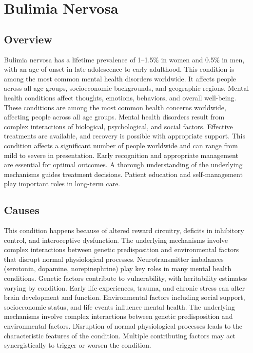 \chapter{Bulimia Nervosa}
\label{sec:Bulimia Nervosa}

\section{Overview}
Bulimia nervosa has a lifetime prevalence of 1--1.5\% in women and 0.5\% in men, with an age of onset in late adolescence to early adulthood. This condition is among the most common mental health disorders worldwide. It affects people across all age groups, socioeconomic backgrounds, and geographic regions. Mental health conditions affect thoughts, emotions, behaviors, and overall well-being. These conditions are among the most common health concerns worldwide, affecting people across all age groups. Mental health disorders result from complex interactions of biological, psychological, and social factors. Effective treatments are available, and recovery is possible with appropriate support. This condition affects a significant number of people worldwide and can range from mild to severe in presentation. Early recognition and appropriate management are essential for optimal outcomes. A thorough understanding of the underlying mechanisms guides treatment decisions. Patient education and self-management play important roles in long-term care.
\section{Causes}
This condition happens because of altered reward circuitry, deficits in inhibitory control, and interoceptive dysfunction. The underlying mechanisms involve complex interactions between genetic predisposition and environmental factors that disrupt normal physiological processes. Neurotransmitter imbalances (serotonin, dopamine, norepinephrine) play key roles in many mental health conditions. Genetic factors contribute to vulnerability, with heritability estimates varying by condition. Early life experiences, trauma, and chronic stress can alter brain development and function. Environmental factors including social support, socioeconomic status, and life events influence mental health. The underlying mechanisms involve complex interactions between genetic predisposition and environmental factors. Disruption of normal physiological processes leads to the characteristic features of the condition. Multiple contributing factors may act synergistically to trigger or worsen the condition.
